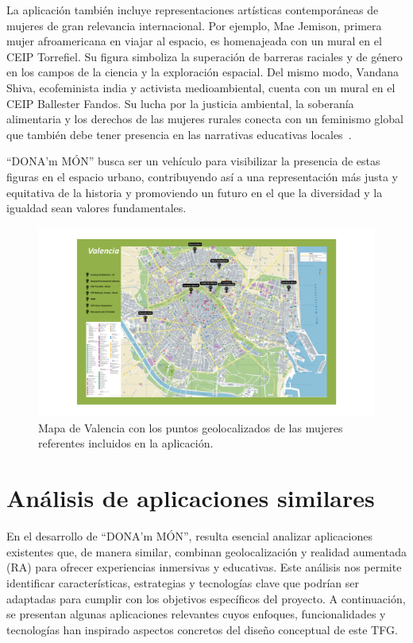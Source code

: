 La aplicación también incluye representaciones artísticas contemporáneas de mujeres de gran relevancia internacional. Por ejemplo, Mae Jemison, primera mujer afroamericana en viajar al espacio, es homenajeada con un mural en el CEIP Torrefiel. Su figura simboliza la superación de barreras raciales y de género en los campos de la ciencia y la exploración espacial. Del mismo modo, Vandana Shiva, ecofeminista india y activista medioambiental, cuenta con un mural en el CEIP Ballester Fandos. Su lucha por la justicia ambiental, la soberanía alimentaria y los derechos de las mujeres rurales conecta con un feminismo global que también debe tener presencia en las narrativas educativas locales~\cite{shiva2005}.

“DONA’m MÓN” busca ser un vehículo para visibilizar la presencia de estas figuras en el espacio urbano, contribuyendo así a una representación más justa y equitativa de la historia y promoviendo un futuro en el que la diversidad y la igualdad sean valores fundamentales.

\begin{figure}[H]
    \centering
    \includegraphics[width=\textwidth]{figs/mapa.png}
    \caption{Mapa de Valencia con los puntos geolocalizados de las mujeres referentes incluidos en la aplicación.}
    \label{fig:mapa_valencia_mujeres}
\end{figure}



\section{Análisis de aplicaciones similares}

En el desarrollo de “DONA’m MÓN”, resulta esencial analizar aplicaciones existentes que, de manera similar, combinan geolocalización y realidad aumentada (RA) para ofrecer experiencias inmersivas y educativas. Este análisis nos permite identificar características, estrategias y tecnologías clave que podrían ser adaptadas para cumplir con los objetivos específicos del proyecto. A continuación, se presentan algunas aplicaciones relevantes cuyos enfoques, funcionalidades y tecnologías han inspirado aspectos concretos del diseño conceptual de este TFG.

